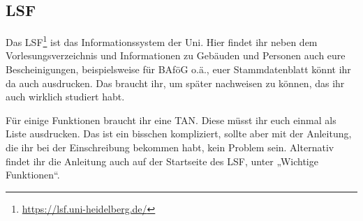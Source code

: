 \subsection*{LSF}
Das LSF\footnote{\url{https://lsf.uni-heidelberg.de/}} ist das Informationssystem der Uni. Hier findet ihr neben dem Vorlesungsverzeichnis und Informationen zu Gebäuden und Personen auch eure Bescheinigungen, beispielsweise für BAföG o.ä., euer Stammdatenblatt könnt ihr da auch ausdrucken. Das braucht ihr, um später nachweisen zu können, das ihr auch wirklich studiert habt.

Für einige Funktionen braucht ihr eine TAN. Diese müsst ihr euch einmal als Liste ausdrucken. Das ist ein bisschen kompliziert, sollte aber mit der Anleitung, die ihr bei der Einschreibung bekommen habt, kein Problem sein. Alternativ findet ihr die Anleitung auch auf der Startseite des LSF, unter „Wichtige Funktionen“.
